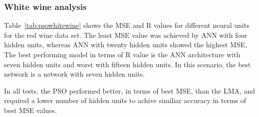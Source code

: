 \begin{table}[htbp]
    \centering
    \caption{Summary of tests performed with PSO for Red wine test data set}
    \label{tab:psoredwine}
\end{table}

\subsubsection{White wine analysis}

Table~\ref{tab:psowhitewine} shows the MSE and R values for different neural units for the red wine data set. The least MSE value was achieved by ANN with four hidden units, whereas ANN with twenty hidden units showed the highest MSE. The best performing model in terms of R value is the ANN architecture with seven hidden units and worst with fifteen hidden units. In this scenario, the best network is a network with seven hidden units.

In all tests, the PSO performed better, in terms of best MSE, than the LMA, and required a lower number of hidden units to achive similiar accuracy in terms of best MSE values. 

